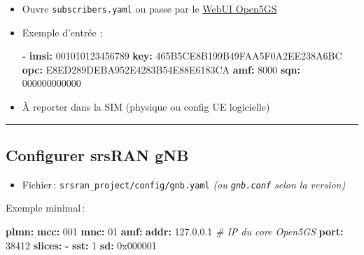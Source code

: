 \documentclass[
  french,
]{article}
\newenvironment{Shaded}{\begin{snugshade}}{\end{snugshade}}
\newcommand{\AttributeTok}[1]{\textcolor[rgb]{0.13,0.29,0.53}{#1}}
\newcommand{\CommentTok}[1]{\textcolor[rgb]{0.56,0.35,0.01}{\textit{#1}}}
\newcommand{\DecValTok}[1]{\textcolor[rgb]{0.00,0.00,0.81}{#1}}
\newcommand{\FloatTok}[1]{\textcolor[rgb]{0.00,0.00,0.81}{#1}}
\newcommand{\FunctionTok}[1]{\textcolor[rgb]{0.13,0.29,0.53}{\textbf{#1}}}
\newcommand{\KeywordTok}[1]{\textcolor[rgb]{0.13,0.29,0.53}{\textbf{#1}}}
\newcommand{\StringTok}[1]{\textcolor[rgb]{0.31,0.60,0.02}{#1}}
\providecommand{\tightlist}{%
  \setlength{\itemsep}{0pt}\setlength{\parskip}{0pt}}
\begin{document}
\begin{itemize}
\item
  Ouvre \texttt{subscribers.yaml} ou passe par le
  \href{https://github.com/open5gs/open5gs/wiki/WebUI}{WebUI Open5GS}
\item
  Exemple d'entrée :

\begin{Shaded}
\begin{Highlighting}[]
\KeywordTok{{-}}\AttributeTok{ }\FunctionTok{imsi}\KeywordTok{:}\AttributeTok{ }\StringTok{\textquotesingle{}001010123456789\textquotesingle{}}
\AttributeTok{  }\FunctionTok{key}\KeywordTok{:}\AttributeTok{ }\StringTok{\textquotesingle{}465B5CE8B199B49FAA5F0A2EE238A6BC\textquotesingle{}}
\AttributeTok{  }\FunctionTok{opc}\KeywordTok{:}\AttributeTok{ }\StringTok{\textquotesingle{}E8ED289DEBA952E4283B54E88E6183CA\textquotesingle{}}
\AttributeTok{  }\FunctionTok{amf}\KeywordTok{:}\AttributeTok{ }\StringTok{\textquotesingle{}8000\textquotesingle{}}
\AttributeTok{  }\FunctionTok{sqn}\KeywordTok{:}\AttributeTok{ }\StringTok{\textquotesingle{}000000000000\textquotesingle{}}
\end{Highlighting}
\end{Shaded}
\item
  À reporter dans la SIM (physique ou config UE logicielle)
\end{itemize}

\begin{center}\rule{0.5\linewidth}{0.5pt}\end{center}

\subsection{Configurer srsRAN gNB}\label{configurer-srsran-gnb}

\begin{itemize}
\tightlist
\item
  Fichier\,: \texttt{srsran\_project/config/gnb.yaml} \emph{(ou
  \texttt{gnb.conf} selon la version)}
\end{itemize}

Exemple minimal\,:

\begin{Shaded}
\begin{Highlighting}[]
\FunctionTok{plmn}\KeywordTok{:}
\AttributeTok{  }\FunctionTok{mcc}\KeywordTok{:}\AttributeTok{ }\DecValTok{001}
\AttributeTok{  }\FunctionTok{mnc}\KeywordTok{:}\AttributeTok{ }\DecValTok{01}
\FunctionTok{amf}\KeywordTok{:}
\AttributeTok{  }\FunctionTok{addr}\KeywordTok{:}\AttributeTok{ }\FloatTok{127.0.0.1}\CommentTok{   \# IP du core Open5GS}
\AttributeTok{  }\FunctionTok{port}\KeywordTok{:}\AttributeTok{ }\DecValTok{38412}
\FunctionTok{slices}\KeywordTok{:}
\AttributeTok{  }\KeywordTok{{-}}\AttributeTok{ }\FunctionTok{sst}\KeywordTok{:}\AttributeTok{ }\DecValTok{1}
\AttributeTok{    }\FunctionTok{sd}\KeywordTok{:}\AttributeTok{ }\DecValTok{0x000001}
\end{Highlighting}
\end{Shaded}
\end{document}
